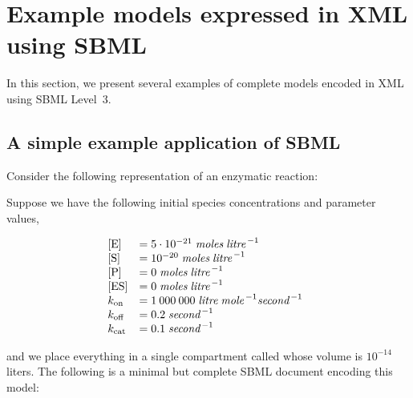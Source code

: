 
\section{Example models expressed in XML using SBML}
\label{sec:xml-rep}
\label{sec:examples}

In this section, we present several examples of complete models
encoded in XML using SBML Level~3.



\subsection{A simple example application of SBML}
\label{sec:modeleg}

Consider the following representation of an enzymatic reaction:
\begin{center}
\end{center}
Suppose we have the following initial species concentrations and
parameter values,
\begin{linenomath}
  \begin{equation*}
    \begin{array}{@{}lll@{}}
      \textrm{[E]}   & = 5 \cdot 10^{-21}\; \emph{moles} \; \emph{litre}^{\,-1}\\
      \textrm{[S]}   & = 10^{-20}\; \emph{moles} \; \emph{litre}^{\,-1}\\
      \textrm{[P]}   & = 0\; \emph{moles} \; \emph{litre}^{\,-1}\\
      \textrm{[ES]}  & = 0\; \emph{moles} \; \emph{litre}^{\,-1}\\
      k_{\text{on}}  & = 1\:000\:000 \;\emph{litre} \;\emph{mole}^{\,-1} \emph{second}^{\,-1}\\
      k_{\text{off}} & = 0.2 \;\emph{second}^{\,-1}\\
      k_{\text{cat}} & = 0.1 \;\emph{second}^{\,-1}
    \end{array}
  \end{equation*}
\end{linenomath}
and we place everything in a single compartment called
 whose volume is $10^{-14}$ liters.  The following
is a minimal but complete SBML document encoding this model:

